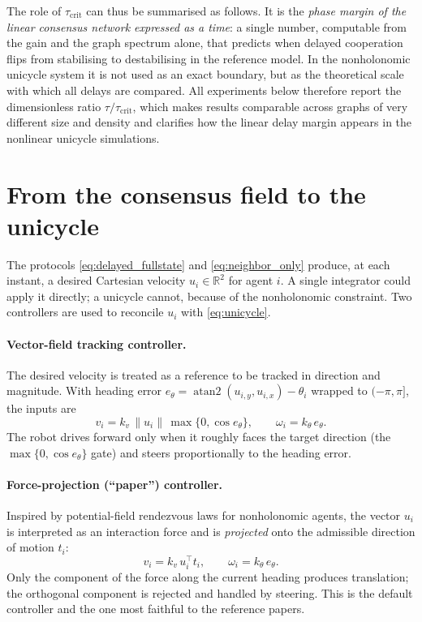 \documentclass[11pt,a4paper]{article}
\newcommand{\R}{\mathbb{R}}
\newcommand{\taucrit}{\tau_{\mathrm{crit}}}
\begin{document}
The role of $\taucrit$ can thus be summarised as follows. It is the \emph{phase margin of the
linear consensus network expressed as a time}: a single number, computable from the gain and
the graph spectrum alone, that predicts when delayed cooperation flips from stabilising to
destabilising in the reference model. In the nonholonomic unicycle system it is not used as an
exact boundary, but as the theoretical scale with which all delays are compared. All
experiments below therefore report the dimensionless ratio $\tau/\taucrit$, which makes
results comparable across graphs of very different size and density and clarifies how the
linear delay margin appears in the nonlinear unicycle simulations.

\section{From the consensus field to the unicycle}
\label{sec:unicycle}

The protocols \eqref{eq:delayed_fullstate} and \eqref{eq:neighbor_only} produce, at each
instant, a desired Cartesian velocity $u_i\in\R^2$ for agent $i$. A single integrator could
apply it directly; a unicycle cannot, because of the nonholonomic constraint. Two controllers
are used to reconcile $u_i$ with \eqref{eq:unicycle}.

\paragraph{Vector-field tracking controller.} The desired velocity is treated as a reference
to be tracked in direction and magnitude. With heading error
$e_\theta=\operatorname{atan2}(u_{i,y},u_{i,x})-\theta_i$ wrapped to $(-\pi,\pi]$, the inputs are
\begin{equation}
v_i = k_v\,\|u_i\|\,\max\{0,\cos e_\theta\}, \qquad
\omega_i = k_\theta\,e_\theta .
\label{eq:vf}
\end{equation}
The robot drives forward only when it roughly faces the target direction (the
$\max\{0,\cos e_\theta\}$ gate) and steers proportionally to the heading error.

\paragraph{Force-projection (``paper'') controller.} Inspired by potential-field rendezvous
laws for nonholonomic agents, the vector $u_i$ is interpreted as an interaction force and is
\emph{projected} onto the admissible direction of motion $t_i$:
\begin{equation}
v_i = k_v\, u_i^\top t_i, \qquad
\omega_i = k_\theta\,e_\theta .
\label{eq:paper}
\end{equation}
Only the component of the force along the current heading produces translation; the orthogonal
component is rejected and handled by steering. This is the default controller and the one most
faithful to the reference papers.
\end{document}
